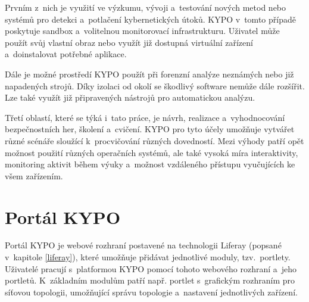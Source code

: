 \documentclass[
  digital, %
  oneside, %
  table,   %
  nolof,     %
  nolot,     %
]{fithesis3}
\begin{document}
Prvním z~nich je využití ve výzkumu, vývoji a~testování nových metod nebo systémů pro detekci a~potlačení kybernetických útoků. KYPO v~tomto případě poskytuje sandbox a~volitelnou monitorovací infrastrukturu. Uživatel může použít svůj vlastní obraz nebo využít již dostupná virtuální zařízení a~doinstalovat potřebné aplikace. \cite{kypo2017}\par
Dále je možné prostředí KYPO použít při forenzní analýze neznámých nebo již napadených strojů. Díky izolaci od okolí se škodlivý software nemůže dále rozšířit. Lze také využít již připravených nástrojů pro automatickou analýzu. \cite{lessons2015, kypo2017}\par
Třetí oblastí, které se týká i~tato práce, je návrh, realizace a~vyhodnocování bezpečnostních her, školení a~cvičení. KYPO pro tyto účely umožňuje vytvářet různé scénáře sloužící k~procvičování různých dovedností. Mezi výhody patří opět možnost použití různých operačních systémů, ale také vysoká míra interaktivity, monitoring aktivit během výuky a~možnost vzdáleného přístupu vyučujících ke všem zařízením. \cite{lessons2015, kypocz}

\section{Portál KYPO}
Portál KYPO je webové rozhraní postavené na technologii Liferay (popsané v~kapitole \ref{liferay}), které umožňuje přidávat jednotlivé moduly, tzv.~portlety. Uživatelé pracují s~platformou KYPO pomocí tohoto webového rozhraní a~jeho portletů. K~základním modulům patří např. portlet s~grafickým rozhraním pro síťovou topologii, umožňující správu topologie a~nastavení jednotlivých zařízení.
\end{document}
